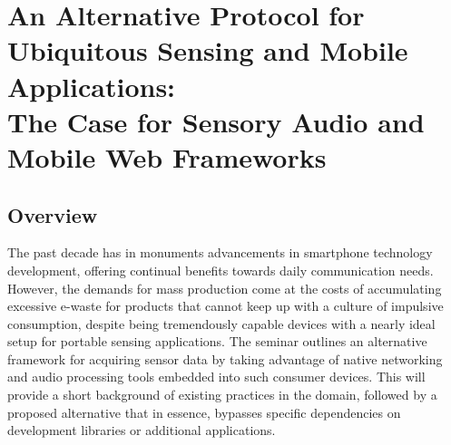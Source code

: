\section[SenseFM]{An Alternative Protocol for Ubiquitous Sensing and Mobile Applications: \\ {\large \indent\hspace{0.09\textwidth} The Case for Sensory Audio and Mobile Web Frameworks}}

\subsection{Overview}

The past decade has in monuments advancements in smartphone technology development, offering continual benefits towards daily communication needs. However, the demands for mass production come at the costs of accumulating excessive e-waste for products that cannot keep up with a culture of impulsive consumption, despite being tremendously capable devices with a nearly ideal setup for portable sensing applications. The seminar outlines an alternative framework for acquiring sensor data by taking advantage of native networking and audio processing tools embedded into such consumer devices. This will provide a short background of existing practices in the domain, followed by a proposed alternative that in essence, bypasses specific dependencies on development libraries or additional applications. 

